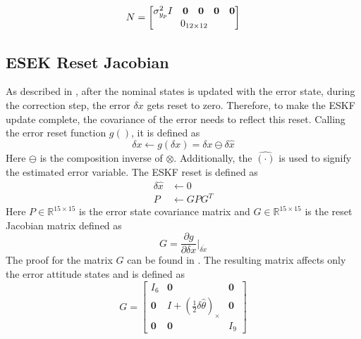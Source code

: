 \begin{equation}
   N =  \begin{bmatrix}
        \sigma^2_{y_p} I & \mathbf{0} & \mathbf{0} & \mathbf{0} & \mathbf{0} \\
        \multicolumn{5}{c}{0_{12 \times 12}}
        \end{bmatrix}
    \label{eq: N quaternion}
\end{equation}

\subsection{ESEK Reset Jacobian}
As described in \cite{Quaternion_Kinematics_for_the_Error-state_EKF}, after the nominal states is updated with the error state, during the correction step, the error $\delta x$ gets reset to zero. Therefore, to make the ESKF update complete, the covariance of the error needs to reflect this reset. Calling the error reset function $g()$, it is defined as \cite{Quaternion_Kinematics_for_the_Error-state_EKF}
\begin{equation}
    \delta x \leftarrow g(\delta x) = \delta x \ominus \delta \hat{x}
    \label{eq: g() reset fnc}
\end{equation}
Here $\ominus$ is the composition inverse of $\otimes$. Additionally, the $\hat{(\cdot)}$ is used to signify the estimated error variable. The ESKF reset is defined as \cite{Quaternion_Kinematics_for_the_Error-state_EKF}
\begin{subequations}
    \begin{align}
        \delta \hat{x} &\leftarrow 0\\
        P &\leftarrow G P G^T
        \label{eq: error reset operation}
    \end{align}
\end{subequations}
Here $P \in \mathbb{R}^{15 \times 15}$ is the error state covariance matrix and $G \in \mathbb{R}^{15 \times 15}$ is the reset Jacobian matrix defined as
\begin{equation}
    G = \frac{\partial g}{\partial \delta x}\bigg|_{\bar{\delta x}}
    \label{eq: G partial}
\end{equation}
The proof for the matrix $G$ can be found in \cite{Quaternion_Kinematics_for_the_Error-state_EKF}. The resulting matrix affects only the error attitude states and is defined as
\begin{equation}
    G = \begin{bmatrix}
        I_6 & \mathbf{0} & \mathbf{0}\\
        \mathbf{0} & I + (\frac{1}{2} \delta \hat{\theta})_{\times} & \mathbf{0}\\
        \mathbf{0} & \mathbf{0} & I_9
    \end{bmatrix}
    \label{eq: Full G matrix}
\end{equation}


